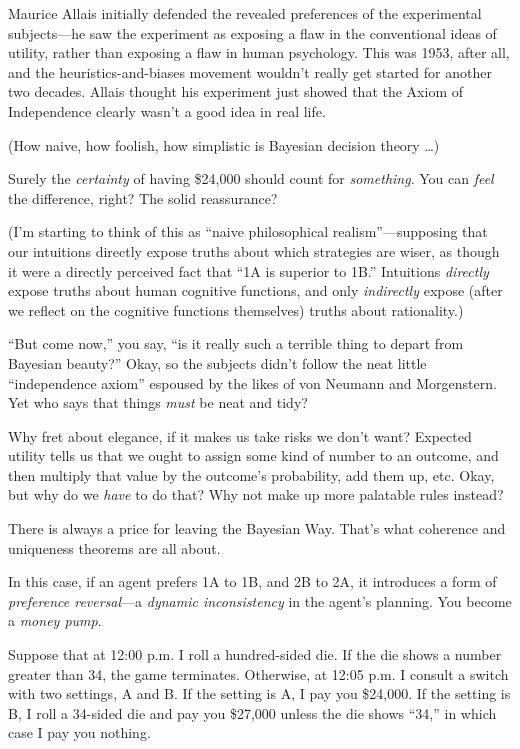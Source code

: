 {
 Maurice Allais initially defended the revealed preferences of the
experimental subjects---he saw the experiment as exposing a flaw in the
conventional ideas of utility, rather than exposing a flaw in human
psychology. This was 1953, after all, and the heuristics-and-biases
movement wouldn't really get started for another two
decades. Allais thought his experiment just showed that the Axiom of
Independence clearly wasn't a good idea in real life.}

{
 (How naive, how foolish, how simplistic is Bayesian decision
theory \ldots)}

{
 Surely the \textit{certainty} of having \$24,000 should count for
\textit{something}. You can \textit{feel} the difference, right? The
solid reassurance?}

{
 (I'm starting to think of this as
``naive philosophical
realism''---supposing that our intuitions directly
expose truths about which strategies are wiser, as though it were a
directly perceived fact that ``1A is superior to
1B.'' Intuitions \textit{directly} expose truths
about human cognitive functions, and only \textit{indirectly} expose
(after we reflect on the cognitive functions themselves) truths about
rationality.)}

{
 ``But come now,'' you say,
``is it really such a terrible thing to depart from
Bayesian beauty?'' Okay, so the subjects
didn't follow the neat little
``independence axiom'' espoused by
the likes of von Neumann and Morgenstern. Yet who says that things
\textit{must} be neat and tidy?}

{
 Why fret about elegance, if it makes us take risks we
don't want? Expected utility tells us that we ought to
assign some kind of number to an outcome, and then multiply that value
by the outcome's probability, add them up, etc. Okay,
but why do we \textit{have} to do that? Why not make up more palatable
rules instead?}

{
 There is always a price for leaving the Bayesian Way.
That's what coherence and uniqueness theorems are all
about.}

{
 In this case, if an agent prefers 1A to 1B, and 2B to 2A, it
introduces a form of \textit{preference reversal}{}---a \textit{dynamic
inconsistency} in the agent's planning. You become a
\textit{money pump}.}

{
 Suppose that at 12:00 p.m. I roll a hundred-sided die. If the die
shows a number greater than 34, the game terminates. Otherwise, at
12:05 p.m. I consult a switch with two settings, A and B. If the
setting is A, I pay you \$24,000. If the setting is B, I roll a
34-sided die and pay you \$27,000 unless the die shows
``34,'' in which case I pay you
nothing.}


